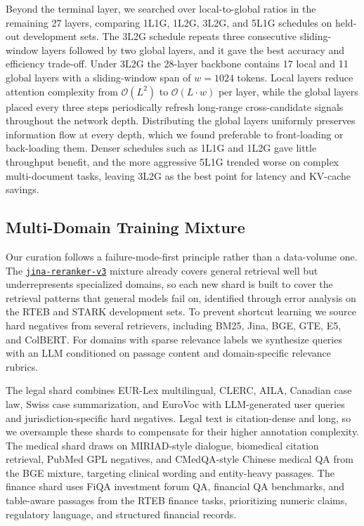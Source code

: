 \documentclass{article}
\newcommand{\jrrvthree}{\href{https://huggingface.co/jinaai/jina-reranker-v3}{\texttt{jina-reranker-v3}}}
\begin{document}
Beyond the terminal layer, we searched over local-to-global ratios in the remaining 27 layers, comparing 1L1G, 1L2G, 3L2G, and 5L1G schedules on held-out development sets. The 3L2G schedule repeats three consecutive sliding-window layers followed by two global layers, and it gave the best accuracy and efficiency trade-off. Under 3L2G the 28-layer backbone contains 17 local and 11 global layers with a sliding-window span of $w=1024$ tokens. Local layers reduce attention complexity from $\mathcal{O}(L^2)$ to $\mathcal{O}(L \cdot w)$ per layer, while the global layers placed every three steps periodically refresh long-range cross-candidate signals throughout the network depth. Distributing the global layers uniformly preserves information flow at every depth, which we found preferable to front-loading or back-loading them. Denser schedules such as 1L1G and 1L2G gave little throughput benefit, and the more aggressive 5L1G trended worse on complex multi-document tasks, leaving 3L2G as the best point for latency and KV-cache savings.

\subsection{Multi-Domain Training Mixture}
\label{sec:data}

Our curation follows a failure-mode-first principle rather than a data-volume one. The \jrrvthree{} mixture already covers general retrieval well but underrepresents specialized domains, so each new shard is built to cover the retrieval patterns that general models fail on, identified through error analysis on the RTEB and STARK development sets. To prevent shortcut learning we source hard negatives from several retrievers, including BM25, Jina, BGE, GTE, E5, and ColBERT. For domains with sparse relevance labels we synthesize queries with an LLM conditioned on passage content and domain-specific relevance rubrics.

The legal shard combines EUR-Lex multilingual, CLERC, AILA, Canadian case law, Swiss case summarization, and EuroVoc with LLM-generated user queries and jurisdiction-specific hard negatives. Legal text is citation-dense and long, so we oversample these shards to compensate for their higher annotation complexity. The medical shard draws on MIRIAD-style dialogue, biomedical citation retrieval, PubMed GPL negatives, and CMedQA-style Chinese medical QA from the BGE mixture, targeting clinical wording and entity-heavy passages. The finance shard uses FiQA investment forum QA, financial QA benchmarks, and table-aware passages from the RTEB finance tasks, prioritizing numeric claims, regulatory language, and structured financial records.
\end{document}
